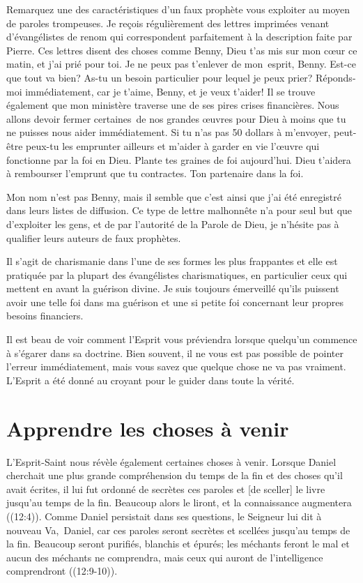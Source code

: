 Remarquez une des caractéristiques d'un faux prophète\frcolon{}
 \Og vous exploiter au moyen de paroles trompeuses. \Fg{}
 Je reçois régulièrement des lettres imprimées
 venant d'évangélistes de renom qui correspondent parfaitement
 à la description faite par Pierre.
 Ces lettres disent des choses comme\frcolon{}
 \Og Benny, Dieu t'as mis sur mon cœur ce matin, et j'ai prié pour toi.
 Je ne peux pas t'enlever de mon~esprit, Benny.
 Est-ce que tout va bien? As-tu un besoin particulier pour lequel je peux prier?
 Réponds-moi immédiatement, car je t'aime, Benny, et je veux t'aider!
 Il se trouve également que mon ministère traverse
 une de ses pires crises financières.
 Nous allons devoir fermer certaines~de nos grandes œuvres pour Dieu
 à moins que tu ne puisses nous aider immédiatement.
 Si tu n'as pas 50 dollars à m'envoyer, peut-être peux-tu les emprunter
 ailleurs et m'aider à garder en vie l'œuvre qui fonctionne par la foi en Dieu.
 Plante tes graines de foi aujourd'hui.
 Dieu t'aidera à rembourser l'emprunt que tu contractes.
 Ton partenaire dans la foi. \Fg{}

Mon nom n'est pas Benny, mais il semble que c'est ainsi que j'ai été enregistré
 dans leurs listes de diffusion.
 Ce type de lettre malhonnête n'a pour seul but que d'exploiter les gens,
 et de par l'autorité de la Parole de Dieu,
 je n'hésite pas à qualifier leurs auteurs de faux prophètes.

Il s'agit de charismanie dans l'une de ses formes les plus frappantes
 et elle est pratiquée par la plupart des évangélistes charismatiques,
 en particulier ceux qui mettent en avant la guérison divine.
 Je suis toujours émerveillé qu'ils puissent avoir une telle foi
 dans ma guérison et une si petite foi concernant leur propres besoins financiers.

Il est beau de voir comment l'Esprit vous préviendra
 lorsque quel\-qu'un commence à s'égarer dans sa doctrine.
 Bien souvent, il ne vous est pas possible de pointer l'erreur immédiatement,
 mais vous savez que quelque chose ne va pas vraiment.
 L'Esprit a été donné au croyant pour le guider dans toute la vérité.


\section{Apprendre les choses \`a venir}

L'Esprit-Saint nous révèle également certaines choses à venir.
 Lorsque Daniel cherchait une plus grande compréhension du temps de la fin
 et des choses qu'il avait écrites, il lui fut ordonné de
 \Og [tenir] secrètes ces paroles et [de sceller] le livre
 jusqu'au temps de la fin.
 Beaucoup alors le liront, et la connaissance augmentera \Fg{}
 ((12:4)).
 Comme Daniel persistait dans ses questions, le Seigneur lui dit à nouveau\frcolon{}
 \Og Va,~Daniel, car ces paroles seront secrètes
 et scellées jusqu'au temps de la fin.
 Beaucoup seront purifiés, blanchis et épurés;
 les méchants feront le mal et aucun des méchants ne comprendra,
 mais ceux qui auront de l'intelligence comprendront \Fg{}
 ((12:9-10)).

